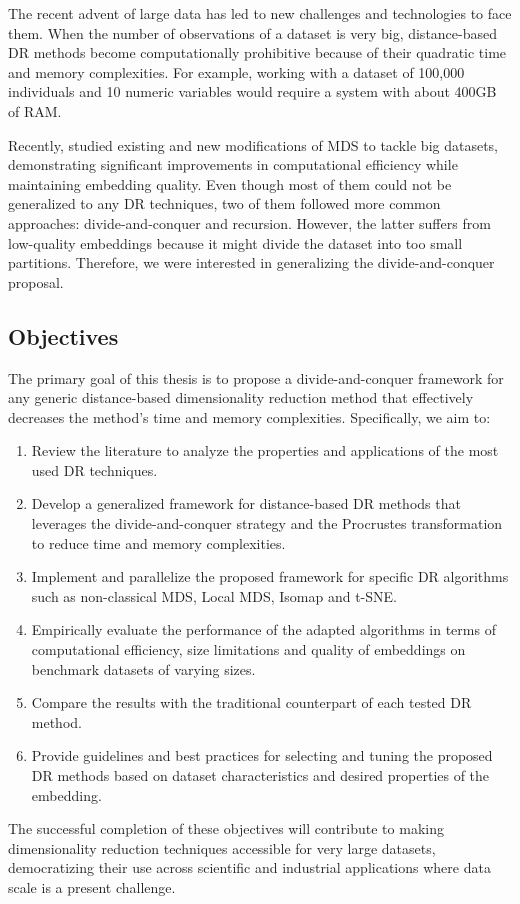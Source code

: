 The recent advent of large data has led to new challenges and technologies to face them. When the number of observations of a dataset is very big, distance-based DR methods become computationally prohibitive because of their quadratic time and memory complexities. For example, working with a dataset of 100,000 individuals and 10 numeric variables would require a system with about 400GB of RAM.

Recently, \cite{Delicado2024} studied existing and new modifications of MDS to tackle big datasets, demonstrating significant improvements in computational efficiency while maintaining embedding quality. Even though most of them could not be generalized to any DR techniques, two of them followed more common approaches: divide-and-conquer and recursion. However, the latter suffers from low-quality embeddings because it might divide the dataset into too small partitions. Therefore, we were interested in generalizing the divide-and-conquer proposal.

\subsection{Objectives}

The primary goal of this thesis is to propose a divide-and-conquer framework for any generic distance-based dimensionality reduction method that effectively decreases the method's time and memory complexities. Specifically, we aim to:

\begin{enumerate}
    \item Review the literature to analyze the properties and applications of the most used DR techniques.
    \item Develop a generalized framework for distance-based DR methods that leverages the divide-and-conquer strategy and the Procrustes transformation to reduce time and memory complexities.
    \item Implement and parallelize the proposed framework for specific DR algorithms such as non-classical MDS, Local MDS, Isomap and t-SNE.
    \item Empirically evaluate the performance of the adapted algorithms in terms of computational efficiency, size limitations and quality of embeddings on benchmark datasets of varying sizes.
    \item Compare the results with the traditional counterpart of each tested DR method.
    \item Provide guidelines and best practices for selecting and tuning the proposed DR methods based on dataset characteristics and desired properties of the embedding.
\end{enumerate}

The successful completion of these objectives will contribute to making  dimensionality reduction techniques accessible for very large datasets, democratizing their use across scientific and industrial applications where data scale is a present challenge.